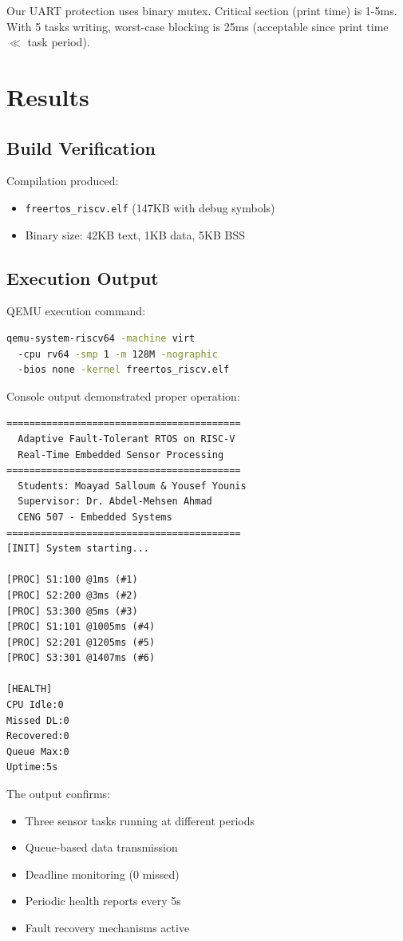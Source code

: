 \documentclass[conference]{IEEEtran}
\begin{document}
Our UART protection uses binary mutex. Critical section (print time) is 1-5ms. With 5 tasks writing, worst-case blocking is 25ms (acceptable since print time \(\ll\) task period).

\section{Results}

\subsection{Build Verification}
Compilation produced:
\begin{itemize}
    \item \texttt{freertos\_riscv.elf} (147KB with debug symbols)
    \item Binary size: 42KB text, 1KB data, 5KB BSS
\end{itemize}

\subsection{Execution Output}
QEMU execution command:
\begin{lstlisting}[language=bash]
qemu-system-riscv64 -machine virt 
  -cpu rv64 -smp 1 -m 128M -nographic 
  -bios none -kernel freertos_riscv.elf
\end{lstlisting}

Console output demonstrated proper operation:

\begin{lstlisting}[basicstyle=\ttfamily\scriptsize]
=========================================
  Adaptive Fault-Tolerant RTOS on RISC-V
  Real-Time Embedded Sensor Processing
=========================================
  Students: Moayad Salloum & Yousef Younis
  Supervisor: Dr. Abdel-Mehsen Ahmad
  CENG 507 - Embedded Systems
=========================================
[INIT] System starting...

[PROC] S1:100 @1ms (#1)
[PROC] S2:200 @3ms (#2)
[PROC] S3:300 @5ms (#3)
[PROC] S1:101 @1005ms (#4)
[PROC] S2:201 @1205ms (#5)
[PROC] S3:301 @1407ms (#6)

[HEALTH]
CPU Idle:0
Missed DL:0
Recovered:0
Queue Max:0
Uptime:5s
\end{lstlisting}

The output confirms:
\begin{itemize}
    \item Three sensor tasks running at different periods
    \item Queue-based data transmission
    \item Deadline monitoring (0 missed)
    \item Periodic health reports every 5s
    \item Fault recovery mechanisms active
\end{itemize}
\end{document}
